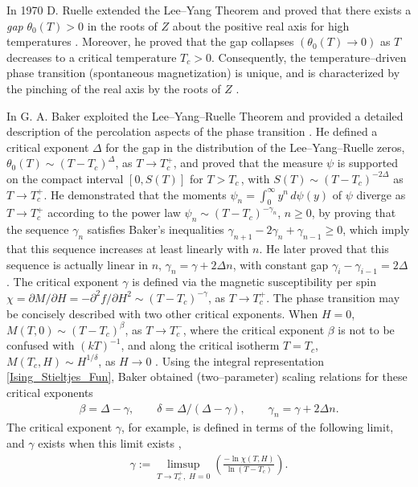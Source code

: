 \documentclass[english,12pt,jmp,graphicx]{revtex4-1}
\begin{document}
In 1970 D. Ruelle extended the Lee--Yang Theorem and proved that
there exists a \emph{gap} $\theta_0(T)>0$ in the roots of $Z$ about the positive
real axis for high temperatures \cite{Ruelle:PRL:303}. Moreover, he
proved that the gap collapses $(\theta_0(T)\to0)$ as $T$ decreases to a
critical temperature $T_c>0$. Consequently, the temperature--driven
phase transition (spontaneous magnetization) is unique, and is
characterized by the pinching of the real axis by the roots of $Z$
\cite{Ruelle-1969}.   

In \cite{Baker:PRB:1184,Baker-1990} G. A. Baker exploited the
Lee--Yang--Ruelle Theorem and provided a detailed description of the 
percolation aspects of the phase transition
\cite{Christensen-2005}. He defined a critical 
exponent $\Delta$ for the gap in the distribution of the Lee--Yang--Ruelle
zeros, $\theta_0(T)\sim(T-T_c)^\Delta$, as $T\to T_c^+$, and proved that
the measure $\psi$ is supported on the compact interval
$[0,S(T)]$ for $T>T_c\,$, with $S(T)\sim(T-T_c)^{-2\Delta}$ as
$T\to T_c^+$. He demonstrated that the moments $\psi_n=\int_0^\infty y^n\,d\psi(y)$ of $\psi$
diverge as $T\to T_c^+$ according to the power law $\psi_n\sim(T-T_c)^{-\gamma_n}$,
$n\geq0$, by proving that the sequence $\gamma_n$ satisfies Baker's
inequalities $\gamma_{n+1}-2\gamma_n+\gamma_{n-1}\geq0$, which imply that this sequence
increases at least linearly with $n$. He later proved that this
sequence is actually linear in $n$, $\gamma_n=\gamma+2\Delta n$, with constant gap $\gamma_i-\gamma_{i-1}=2\Delta$
\cite{Baker-1990}. The critical exponent $\gamma$ is defined via the 
magnetic susceptibility per spin $\chi=\partial M/\partial H=-\partial^2f/\partial H^2\sim(T-T_c)^{-\gamma}$, as
$T\to T_c^+$. The phase transition may be concisely described with two
other critical exponents. When $H=0$, $M(T,0)\sim(T-T_c)^\beta$, as $T\to T_c^-$,
where the critical exponent $\beta$ is not to be confused with
$(kT)^{-1}$, and along the critical isotherm $T=T_c$, $M(T_c,H)\sim H^{1/\delta}$,
as $H\to0$ \cite{Christensen-2005,Baker-1990}. Using the integral
representation \eqref{Ising_Stieltjes_Fun}, Baker obtained 
(two--parameter) scaling relations for these critical exponents
\cite{Baker-1990} 
%
\begin{align}\label{eq:Ising_Scaling_Relations}
  \beta=\Delta-\gamma, \qquad \delta=\Delta/(\Delta-\gamma), \qquad \gamma_n=\gamma+2\Delta n.
\end{align}
%
The critical exponent $\gamma$, for example, is defined
in terms of the following limit, and $\gamma$ exists when this limit exists
\cite{Baker-1990},
% 
\begin{align}\label{eq:Critical_Exponent_Existence}
  \gamma:=\limsup_{T\to T_c^+, \;H=0}\left(\frac{-\ln \chi(T,H)}{\ln(T-T_c)}  \right).
\end{align}
%
\end{document}

